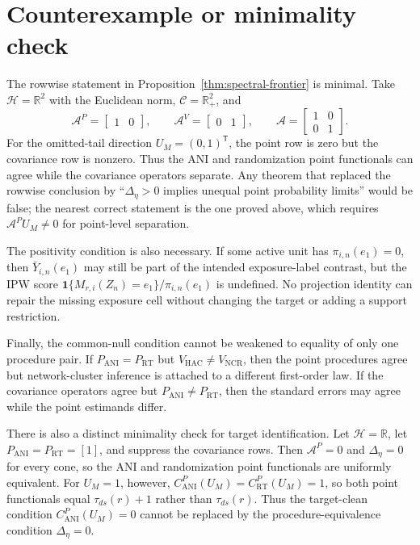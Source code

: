 \documentclass[11pt]{article}
\newcommand{\one}{\mathbf{1}}
\newcommand{\transpose}{\mathsf{T}}
\newcommand{\R}{\mathbb{R}}
\theoremstyle{definition}
\theoremstyle{plain}
\theoremstyle{remark}
\begin{document}
\section{Counterexample or minimality check}
The rowwise statement in Proposition~\ref{thm:spectral-frontier} is minimal.  Take
\(\mathcal H=\R^2\) with the Euclidean norm,
\(\mathcal C=\R^2_+\), and
\[
  \mathcal A^P=\begin{bmatrix}1&0\end{bmatrix},
  \qquad
  \mathcal A^V=\begin{bmatrix}0&1\end{bmatrix},
  \qquad
  \mathcal A=\begin{bmatrix}1&0\\0&1\end{bmatrix}.
\]
For the omitted-tail direction \(U_M=(0,1)^{\transpose}\), the point row is
zero but the covariance row is nonzero.  Thus the ANI and randomization point
functionals can agree while the covariance operators separate.  Any theorem
that replaced the rowwise conclusion by ``\(\Delta_\eta>0\) implies unequal
point probability limits'' would be false; the nearest correct statement is
the one proved above, which requires \(\mathcal A^P U_M\ne0\) for point-level
separation.

The positivity condition is also necessary.  If some active unit has
\(\pi_{i,n}(e_1)=0\), then \(\bar Y_{i,n}(e_1)\) may still be part of the
intended exposure-label contrast, but the IPW score
\(\one\{M_{r,i}(Z_n)=e_1\}/\pi_{i,n}(e_1)\) is undefined.  No projection
identity can repair the missing exposure cell without changing the target or
adding a support restriction.

Finally, the common-null condition cannot be weakened to equality of only one
procedure pair.  If \(P_{\mathrm{ANI}}=P_{\mathrm{RT}}\) but
\(V_{\mathrm{HAC}}\ne V_{\mathrm{NCR}}\), then the point procedures agree but
network-cluster inference is attached to a different first-order law.  If the
covariance operators agree but \(P_{\mathrm{ANI}}\ne P_{\mathrm{RT}}\), then
the standard errors may agree while the point estimands differ.

There is also a distinct minimality check for target identification.  Let
\(\mathcal H=\R\), let \(P_{\mathrm{ANI}}=P_{\mathrm{RT}}=[1]\), and suppress
the covariance rows.  Then \(\mathcal A^P=0\) and
\(\Delta_\eta=0\) for every cone, so the ANI and randomization point
functionals are uniformly equivalent.  For \(U_M=1\), however,
\(C^P_{\mathrm{ANI}}(U_M)=C^P_{\mathrm{RT}}(U_M)=1\), so both point
functionals equal \(\tau_{ds}(r)+1\) rather than \(\tau_{ds}(r)\).  Thus the
target-clean condition \(C^P_{\mathrm{ANI}}(U_M)=0\) cannot be replaced by the
procedure-equivalence condition \(\Delta_\eta=0\).
\end{document}
